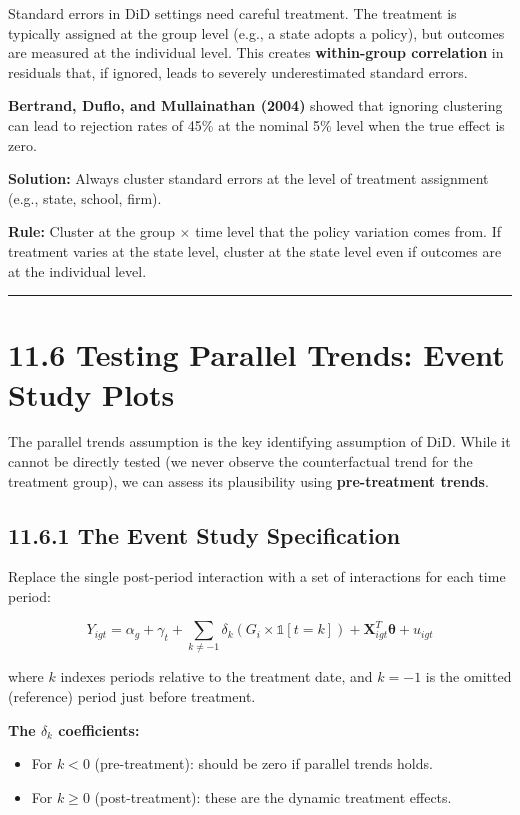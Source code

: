 Standard errors in DiD settings need careful treatment. The treatment is typically assigned at the group level (e.g., a state adopts a policy), but outcomes are measured at the individual level. This creates \textbf{within-group correlation} in residuals that, if ignored, leads to severely underestimated standard errors.

\textbf{Bertrand, Duflo, and Mullainathan (2004)} showed that ignoring clustering can lead to rejection rates of 45\% at the nominal 5\% level when the true effect is zero.

\textbf{Solution:} Always cluster standard errors at the level of treatment assignment (e.g., state, school, firm).

\textbf{Rule:} Cluster at the group $\times$ time level that the policy variation comes from. If treatment varies at the state level, cluster at the state level even if outcomes are at the individual level.

\medskip\hrule\medskip

\section{11.6 Testing Parallel Trends: Event Study Plots}

The parallel trends assumption is the key identifying assumption of DiD. While it cannot be directly tested (we never observe the counterfactual trend for the treatment group), we can assess its plausibility using \textbf{pre-treatment trends}.

\subsection{11.6.1 The Event Study Specification}

Replace the single post-period interaction with a set of interactions for each time period:

\[
Y_{igt} = \alpha_g + \gamma_t + \sum_{k \neq -1} \delta_k (G_i \times \mathbb{1}[t=k]) + \mathbf{X}_{igt}^T\boldsymbol{\theta} + u_{igt}
\]

where $k$ indexes periods relative to the treatment date, and $k = -1$ is the omitted (reference) period just before treatment.

\textbf{The $\delta_k$ coefficients:}
\begin{itemize}
\item For $k < 0$ (pre-treatment): should be zero if parallel trends holds.
\item For $k \geq 0$ (post-treatment): these are the dynamic treatment effects.
\end{itemize}

